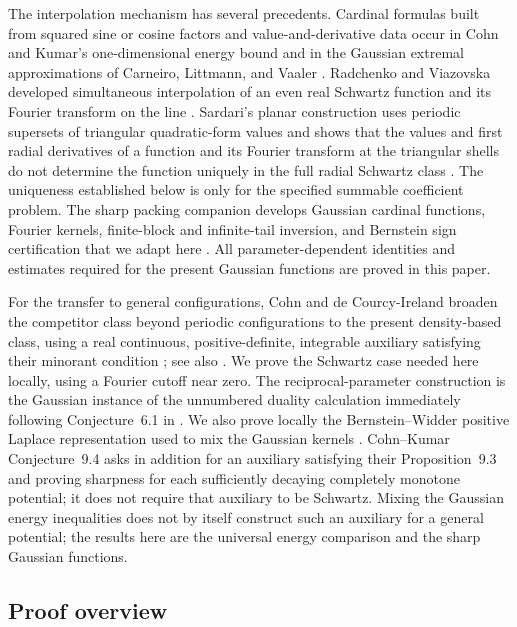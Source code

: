 \documentclass[11pt]{article}
\theoremstyle{remark}\newtheorem{remark}[theorem]{Remark}
\begin{document}
The interpolation mechanism has several precedents. Cardinal formulas built
from squared sine or cosine factors and value-and-derivative data occur in
Cohn and Kumar's one-dimensional energy bound
\cite[Proposition~9.6]{CohnKumar2007} and in the Gaussian
extremal approximations of Carneiro, Littmann, and Vaaler
\cite[formulas~(1.2)--(1.3)]{CarneiroLittmannVaaler2013}.
Radchenko and Viazovska developed simultaneous interpolation of an even
real Schwartz function and its Fourier transform on the line
\cite[Theorem~1]{RadchenkoViazovska2019}. Sardari's planar construction uses
periodic supersets of triangular quadratic-form values and shows that the
values and first radial derivatives of a function and its Fourier transform
at the triangular shells do not determine the function uniquely in the full
radial Schwartz class \cite[Section~6.1 and Theorem~1.7]{Sardari2021}.
The uniqueness established below is only for the specified summable
coefficient problem.
The sharp packing companion develops Gaussian cardinal functions,
Fourier kernels, finite-block and infinite-tail inversion, and Bernstein
sign certification that we adapt here
\cite[Sections~2--4]{SharpPlanar2026}. All parameter-dependent identities
and estimates required for the present Gaussian functions are proved in
this paper.

For the transfer to general configurations, Cohn and de Courcy-Ireland
broaden the competitor class beyond periodic configurations to the present
density-based class, using a real continuous, positive-definite, integrable
auxiliary satisfying their minorant condition
\cite[Proposition~2.2]{CohnDeCourcyIreland2018}; see also
\cite[Proposition~1.6]{CKMRV2022}. We prove the Schwartz case needed here
locally, using a Fourier cutoff near zero. The reciprocal-parameter
construction is the Gaussian instance of the unnumbered duality calculation
immediately following Conjecture~6.1 in \cite[Section~6]{CohnMiller2016}.
We also prove locally the Bernstein--Widder positive Laplace representation
used to mix the Gaussian kernels \cite{Bernstein1929,Widder1931}.
Cohn--Kumar Conjecture~9.4 asks in
addition for an auxiliary satisfying their Proposition~9.3 and proving
sharpness for each sufficiently decaying completely monotone potential; it
does not require that auxiliary to be Schwartz. Mixing the Gaussian energy
inequalities does not by itself construct such an auxiliary for a general
potential; the results
here are the universal energy comparison and the sharp Gaussian functions.

\subsection{Proof overview}
\end{document}
